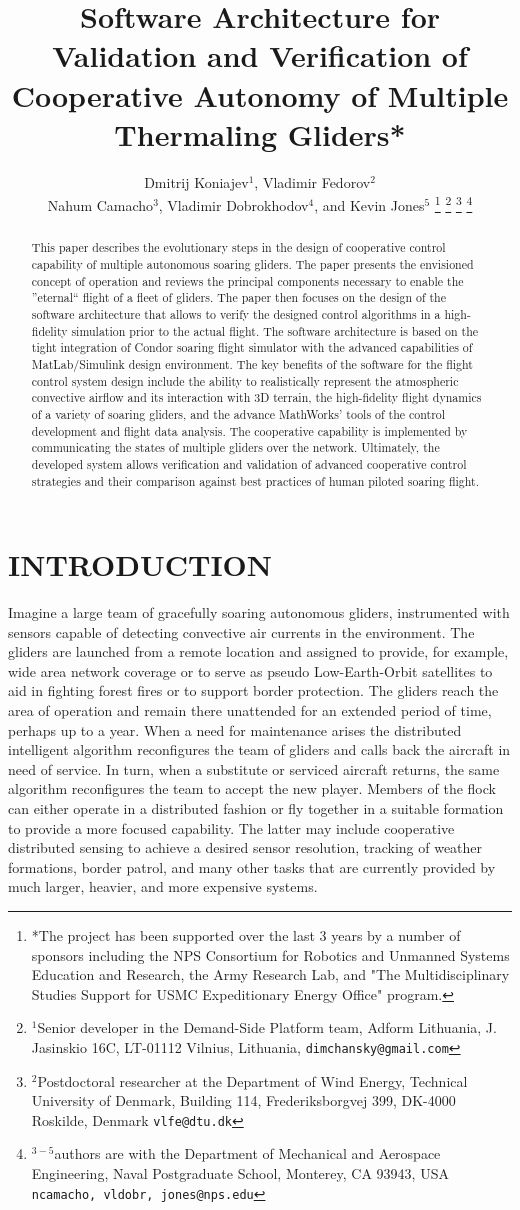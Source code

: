 \documentclass[letterpaper, 10 pt, conference]{ieeeconf}  %
\title{\LARGE \bf
Software Architecture for Validation and Verification of Cooperative Autonomy of Multiple Thermaling Gliders* }
\author{Dmitrij Koniajev$^{1}$, Vladimir Fedorov$^{2}$ \\
    Nahum Camacho$^{3}$, Vladimir Dobrokhodov$^{4}$, and Kevin Jones$^{5}$%
\thanks{*The project has been supported over the last 3 years by a number of
sponsors including the NPS Consortium for Robotics and Unmanned Systems Education and Research, the Army Research Lab, and "The Multidisciplinary
Studies Support for USMC Expeditionary Energy Office" program.}%
\thanks{$^{1}$Senior developer in the Demand-Side Platform team,
        Adform Lithuania, J. Jasinskio 16C, LT-01112 Vilnius, Lithuania,
        {\tt\small {dimchansky@gmail.com}}}%
\thanks{$^{2}$Postdoctoral researcher at the Department of Wind Energy,
        Technical University of Denmark, Building 114, Frederiksborgvej 399, DK-4000 Roskilde,
        Denmark
        {\tt\small {vlfe@dtu.dk}}}%
\thanks{$^{3-5}$authors are with the Department of Mechanical and Aerospace Engineering,
        Naval Postgraduate School, Monterey, CA 93943, USA
        {\tt\small {ncamacho, vldobr, jones}@nps.edu}}%
} %
\begin{document}
\maketitle \thispagestyle{empty} \pagestyle{empty}


\begin{abstract}
This paper describes the evolutionary steps in the design of cooperative control capability of multiple autonomous soaring gliders. The paper presents the envisioned concept of operation and reviews the principal components necessary to enable the ''eternal`` flight of a fleet of gliders. The paper then focuses on the design of the software architecture that allows to verify the designed control algorithms in a high-fidelity simulation prior to the actual flight. The software architecture is based on the tight integration of Condor soaring flight simulator with the advanced capabilities of MatLab/Simulink design environment. The key benefits of the software for the flight control system design include the ability to realistically represent the atmospheric convective airflow and its interaction with 3D terrain, the high-fidelity flight dynamics of a variety of soaring gliders, and the advance MathWorks' tools of the control development and flight data analysis. The cooperative capability is implemented by communicating the states of multiple gliders over the network. Ultimately, the developed system allows verification and validation of advanced cooperative control strategies and their comparison against best practices of human piloted soaring flight.
\end{abstract}


\section{INTRODUCTION}

Imagine a large team of gracefully soaring autonomous gliders, instrumented with sensors capable of detecting convective air currents in the environment. The gliders are launched from a remote location and assigned to provide, for example, wide area network coverage or to serve as pseudo Low-Earth-Orbit satellites to aid in fighting forest fires or to support border protection. The gliders reach the area of operation and remain there unattended for an extended period of time, perhaps up to a year. When a need for maintenance arises the distributed intelligent algorithm reconfigures the team of gliders and calls back the aircraft in need of service. In turn, when a substitute or serviced aircraft returns, the same algorithm reconfigures the team to accept the new player. Members of the flock can either operate in a distributed fashion or fly together in a suitable formation to provide a more focused capability. The latter may include cooperative distributed sensing to achieve a desired sensor resolution, tracking of weather formations, border patrol, and many other tasks that are currently provided by much larger, heavier, and more expensive systems.
\end{document}

